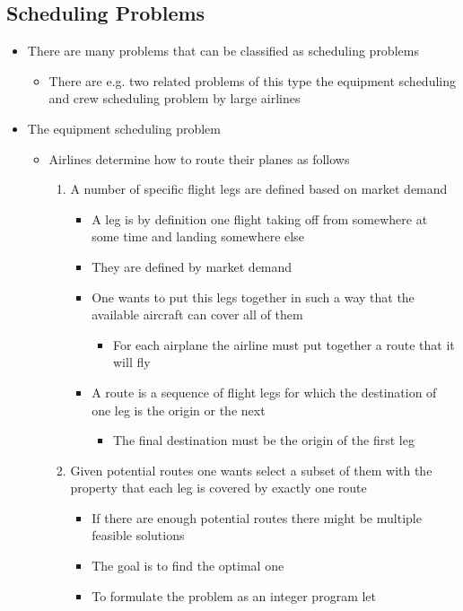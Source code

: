 \documentclass[11pt]{article}
\begin{document}
\subsection{Scheduling Problems}
\label{sec:org2ab22b2}
\begin{itemize}
\item There are many problems that can be classified as scheduling problems
\begin{itemize}
\item There are e.g. two related problems of this type the equipment scheduling and crew scheduling problem by large airlines
\end{itemize}

\item The equipment scheduling problem	
\begin{itemize}
\item Airlines determine how to route their planes as follows
\begin{enumerate}
\item A number of specific flight legs are defined based on market demand
\begin{itemize}
\item A leg is by definition one flight taking off from somewhere at some time and landing somewhere else
\item They are defined by market demand
\item One wants to put this legs together in such a way that the available aircraft can cover all of them
\begin{itemize}
\item For each airplane the airline must put together a route that it will fly
\end{itemize}
\item A route is a sequence of flight legs for which the destination of one leg is the origin or the next
\begin{itemize}
\item The final destination must be the origin of the first leg
\end{itemize}
\end{itemize}
\item Given potential routes one wants select a subset of them with the property that each leg is covered by exactly one route
\begin{itemize}
\item If there are enough potential routes there might be multiple feasible solutions
\item The goal is to find the optimal one
\item To formulate the problem as an integer program let
\end{itemize}
\end{enumerate}
\end{itemize}
\end{itemize}
\end{document}
